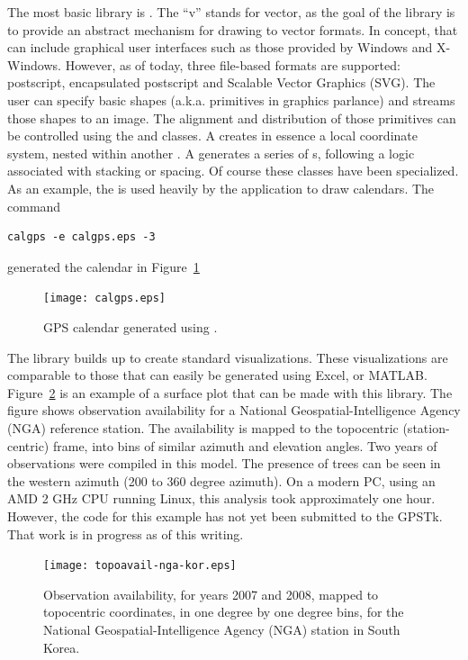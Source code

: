 The most basic library is . The ``v'' stands for
vector, as the goal of the library is to provide an abstract mechanism
for drawing to vector formats. In concept, that can include graphical
user interfaces such as those provided by Windows and X-Windows.
However, as of today, three file-based formats are supported: postscript,
encapsulated postscript and Scalable Vector Graphics
(SVG). The user can specify basic shapes (a.k.a. primitives in
graphics parlance) and streams those shapes to an image. The alignment
and distribution of those primitives can be controlled using the
 and  classes.  A
 creates in essence a local coordinate system,
nested within another . A 
generates a series of s, following a logic
associated with stacking or spacing.  Of course these classes 
have been specialized. As an example, the 
is used heavily by the application  to draw
calendars. The command
%
\begin{scriptsize}
\begin{lstlisting}
calgps -e calgps.eps -3
\end{lstlisting}
\end{scriptsize}
%
generated the calendar in Figure~\ref{fig:calgps}
%
\begin{figure}[h!]
 \centering
 \texttt{[image: calgps.eps]}
 \caption{GPS calendar generated using .}
 \label{fig:calgps}
\end{figure}
%

The  library builds up  to
create standard visualizations. These visualizations are comparable to
those that can easily be generated using Excel,  or
MATLAB. Figure~\ref{fig:surfaceplotex} is an example of a surface plot
that can be made with this library. The figure shows observation
availability for a National Geospatial-Intelligence Agency (NGA)
reference station. The availability is mapped to the topocentric
(station-centric) frame, into bins of similar azimuth and elevation
angles.  Two years of observations were compiled in this model. The
presence of trees can be seen in the western azimuth (200 to 360
degree azimuth).  On a modern PC, using an AMD 2 GHz CPU running
Linux, this analysis took approximately one hour.  However, the code
for this example has not yet been submitted to the GPSTk. That work is
in progress as of this writing.
%
\begin{figure}
  \centering
  \texttt{[image: topoavail-nga-kor.eps]}
  \caption{Observation availability, for years 2007 and 2008, mapped to topocentric coordinates, in one degree by one degree bins, for the National Geospatial-Intelligence Agency (NGA) station in South Korea.}
  \label{fig:surfaceplotex}
\end{figure}
%
